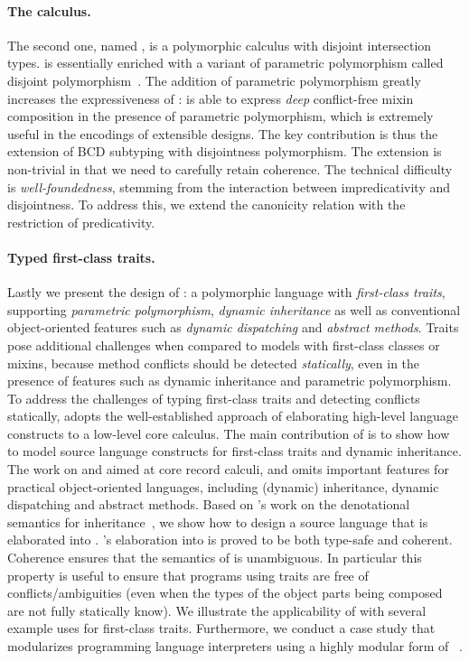\paragraph{The \fnamee calculus.}

The second one, named \fnamee, is a polymorphic calculus with disjoint
intersection types. \fnamee is essentially \namee enriched with a variant of
parametric polymorphism called disjoint polymorphism~\citep{alpuimdisjoint}. The
addition of parametric polymorphism greatly increases the expressiveness of
\namee: \fnamee is able to express \emph{deep} conflict-free mixin composition
in the presence of parametric polymorphism, which is extremely useful in the
encodings of extensible designs. The key contribution is thus the extension of BCD
subtyping with disjointness polymorphism. The extension is non-trivial in that
we need to carefully retain coherence. The technical difficulty is
\emph{well-foundedness}, stemming from the interaction between impredicativity
and disjointness. To address this, we extend the canonicity relation with the
restriction of predicativity.


\paragraph{Typed first-class traits.}

Lastly we present the design of \sedel: a polymorphic language with
\emph{first-class traits}, supporting \emph{parametric polymorphism}, \emph{dynamic inheritance} as well as
conventional object-oriented features such as \emph{dynamic dispatching} and \emph{abstract
  methods}. Traits pose additional challenges when compared to models with
first-class classes or mixins, because method conflicts should be detected
\emph{statically}, even in the presence of features such as dynamic inheritance and
parametric polymorphism. To address the challenges of
typing first-class traits and detecting conflicts statically, \sedel adopts the
well-established approach of elaborating high-level language constructs to a
low-level core calculus. The main contribution of \sedel is to show how to model
source language constructs for first-class traits and dynamic inheritance. The
work on \namee and \fnamee aimed at core record calculi, and omits important
features for practical object-oriented languages, including (dynamic) inheritance, dynamic
dispatching and abstract methods. Based on \citeauthor{cook1989denotational}'s
work on the denotational semantics for inheritance~\citep{cook1989denotational},
we show how to design a source language that is elaborated into \fnamee.
\sedel's elaboration into \fnamee is proved to be both type-safe and coherent.
Coherence ensures that the semantics of \sedel is unambiguous. In particular
this property is useful to ensure that programs using traits are free of
conflicts/ambiguities (even when the types of the object parts being composed
are not fully statically know). We illustrate the applicability of \sedel with
several example uses for first-class traits. Furthermore, we conduct a case study
that modularizes programming language interpreters using a highly modular form
of \visitor~\citep{oliveira09modular, togersen:2004}.

